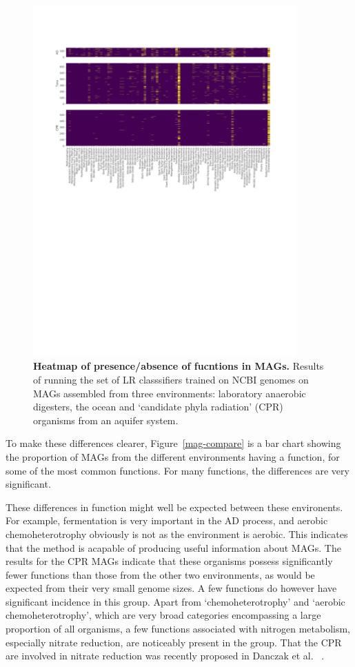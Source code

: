 \documentclass[10pt,letterpaper]{article}
\begin{document}
\begin{figure}
\includegraphics[width=0.9\textwidth]{mag_heatmaps_cpr}
\caption{{\bf Heatmap of presence/absence of fucntions in MAGs.}
Results of running the set of LR classsifiers trained on NCBI genomes on MAGs assembled from three environments: laboratory anaerobic digesters, the ocean and `candidate phyla radiation' (CPR) organisms from an aquifer system.}
\label{heatmap}
\end{figure}

To make these differences clearer, Figure~\ref{mag-compare} is a bar chart showing the proportion of MAGs from the different environments having a function, for some of the most common functions. For many functions, the differences are very significant. 

These differences in function might well be expected between these environents. For example, fermentation is very important in the AD process, and aerobic chemoheterotrophy obviously is not as the environment is aerobic. This indicates that the method is acapable of producing useful information about MAGs. The results for the CPR MAGs indicate that these organisms possess significantly fewer functions than those from the other two environments, as would be expected from their very small genome sizes. A few functions do however have significant incidence in this group. Apart from `chemoheterotrophy' and `aerobic chemoheterotrophy', which are very broad categories encompassing a large proportion of all organisms, a few functions associated with nitrogen metabolism, especially nitrate reduction, are noticeably present in the group. That the CPR are involved in nitrate reduction was recently proposed in Danczak et al. ~\cite{Danczak2017}.
\end{document}
